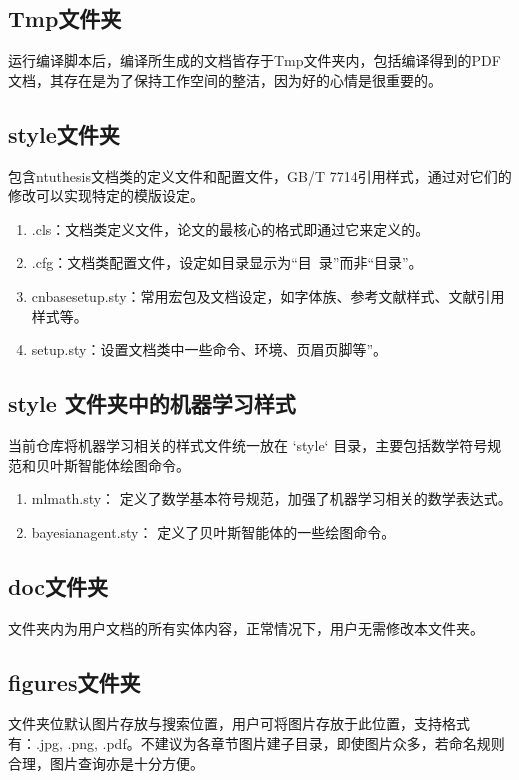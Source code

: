 \subsection{Tmp文件夹}

运行编译脚本后，编译所生成的文档皆存于Tmp文件夹内，包括编译得到的PDF文档，其存在是为了保持工作空间的整洁，因为好的心情是很重要的。

\subsection{style文件夹}

包含ntuthesis文档类的定义文件和配置文件，GB/T 7714引用样式，通过对它们的修改可以实现特定的模版设定。

\begin{enumerate}
    \item \projectname.cls：文档类定义文件，论文的最核心的格式即通过它来定义的。
    \item \projectname.cfg：文档类配置文件，设定如目录显示为“目~录”而非“目录”。
    \item cnbasesetup.sty：常用宏包及文档设定，如字体族、参考文献样式、文献引用样式等。
    \item \projectname setup.sty：设置文档类中一些命令、环境、页眉页脚等”。
\end{enumerate}

\subsection{style 文件夹中的机器学习样式}
当前仓库将机器学习相关的样式文件统一放在 `style` 目录，主要包括数学符号规范和贝叶斯智能体绘图命令。
\begin{enumerate}
    \item mlmath.sty： 定义了数学基本符号规范，加强了机器学习相关的数学表达式。
    \item bayesianagent.sty： 定义了贝叶斯智能体的一些绘图命令。
\end{enumerate}

\subsection{doc文件夹}
文件夹内为用户文档的所有实体内容，正常情况下，用户无需修改本文件夹。


\subsection{figures文件夹}
文件夹位默认图片存放与搜索位置，用户可将图片存放于此位置，支持格式有：.jpg, .png, .pdf。不建议为各章节图片建子目录，即使图片众多，若命名规则合理，图片查询亦是十分方便。

